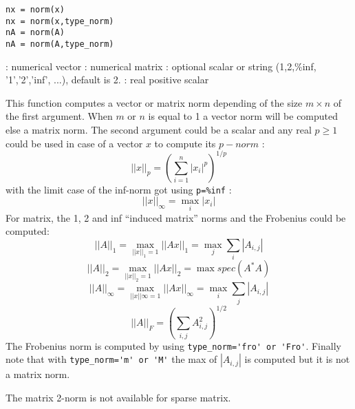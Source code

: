 
\begin{mandesc}
\end{mandesc}

\begin{calling_sequence}
\begin{verbatim}
nx = norm(x)
nx = norm(x,type_norm)
nA = norm(A)
nA = norm(A,type_norm)
\end{verbatim}
\end{calling_sequence}
\begin{parameters}
  \begin{varlist}
     :  numerical vector
     :  numerical matrix
     : optional scalar or string (1,2,\%inf, '1','2','inf',
    ...), default is 2.
     : real positive scalar
  \end{varlist}
\end{parameters}

\begin{mandescription}
This function computes a vector or matrix norm depending of the size $m
\times n$ of the  first argument. When $m$ or $n$ is equal to 1 a vector
norm will be computed else a matrix norm. The second argument could
be a scalar and any real $p \ge 1$ could be used in case of a vector
$x$ to compute its $p-norm$ :
$$
    ||x||_p = \left( \sum_{i=1}^n |x_i|^p \right)^{1/p}
$$
with the limit case of the inf-norm got using \verb+p=%inf+ :
$$
    ||x||_{\infty} = \max_i |x_i|
$$
For matrix, the 1, 2 and inf ``induced matrix'' norms and the
Frobenius could be computed:
$$
    ||A||_1 = \max_{||x||_1 = 1} ||Ax||_1 = \max_j \sum_i |A_{i,j}|  
$$
$$
    ||A||_2 = \max_{||x||_2 = 1} ||Ax||_2 = \max spec(A^* A)
$$
$$
    ||A||_{\infty} = \max_{||x||{\infty} = 1} ||Ax||_{\infty} = \max_i \sum_j |A_{i,j}|  
$$
$$
   ||A||_F =  \left( \sum_{i,j} A_{i,j}^2 \right)^{1/2}
$$
The Frobenius norm is computed by using  \verb+type_norm='fro' or 'Fro'+. 
Finally note that with \verb+type_norm='m' or 'M'+ the max 
of $|A_{i,j}|$ is computed but it is not a matrix norm.

The matrix 2-norm is not available for sparse matrix.

\end{mandescription}

